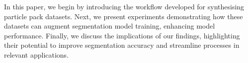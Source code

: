 \documentclass[preprint,12pt]{elsarticle}
\begin{document}
In this paper, we begin by introducing the workflow developed for synthesising particle pack datasets.
Next, we present experiments demonstrating how these datasets can augment segmentation model training, enhancing model performance.
Finally, we discuss the implications of our findings, highlighting their potential to improve segmentation accuracy and streamline processes in relevant applications.

\par
\end{document}
